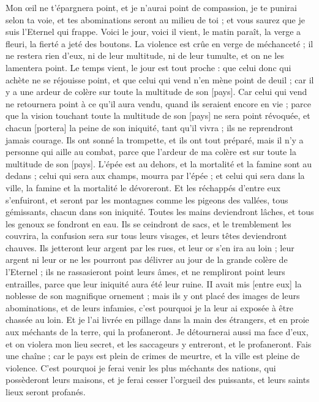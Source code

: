 \begin{multicols}{2}
Mon œil ne t'épargnera point, et je n'aurai point de compassion, je te punirai selon ta voie, et tes abominations seront au milieu de toi ; et vous saurez que je suis l'Eternel qui frappe.
Voici le jour, voici il vient, le matin paraît, la verge a fleuri, la fierté a jeté des boutons.
La violence est crûe en verge de méchanceté ; il ne restera rien d'eux, ni de leur multitude, ni de leur tumulte, et on ne les lamentera point.
Le temps vient, le jour est tout proche : que celui donc qui achète ne se réjouisse point, et que celui qui vend n'en mène point de deuil ; car il y a une ardeur de colère sur toute la multitude de son [pays].
Car celui qui vend ne retournera point à ce qu'il aura vendu, quand ils seraient encore en vie ; parce que la vision touchant toute la multitude de son [pays] ne sera point révoquée, et chacun [portera] la peine de son iniquité, tant qu'il vivra ; ils ne reprendront jamais courage.
Ils ont sonné la trompette, et ils ont tout préparé, mais il n'y a personne qui aille au combat, parce que l'ardeur de ma colère est sur toute la multitude de son [pays].
L'épée est au dehors, et la mortalité et la famine sont au dedans ; celui qui sera aux champs, mourra par l'épée ; et celui qui sera dans la ville, la famine et la mortalité le dévoreront.
Et les réchappés d'entre eux s'enfuiront, et seront par les montagnes comme les pigeons des vallées, tous gémissants, chacun dans son iniquité.
Toutes les mains deviendront lâches, et tous les genoux se fondront en eau.
Ils se ceindront de sacs, et le tremblement les couvrira, la confusion sera sur tous leurs visages, et leurs têtes deviendront chauves.
Ils jetteront leur argent par les rues, et leur or s'en ira au loin ; leur argent ni leur or ne les pourront pas délivrer au jour de la grande colère de l'Eternel ; ils ne rassasieront point leurs âmes, et ne rempliront point leurs entrailles, parce que leur iniquité aura été leur ruine.
II avait mis [entre eux] la noblesse de son magnifique ornement ; mais ils y ont placé des images de leurs abominations, et de leurs infamies, c'est pourquoi je la leur ai exposée à être chassée au loin.
Et je l'ai livrée en pillage dans la main des étrangers, et en proie aux méchants de la terre, qui la profaneront.
Je détournerai aussi ma face d'eux, et on violera mon lieu secret, et les saccageurs y entreront, et le profaneront.
Fais une chaîne ; car le pays est plein de crimes de meurtre, et la ville est pleine de violence.
C'est pourquoi je ferai venir les plus méchants des nations, qui possèderont leurs maisons, et je ferai cesser l'orgueil des puissants, et leurs saints lieux seront profanés.

\end{multicols}
